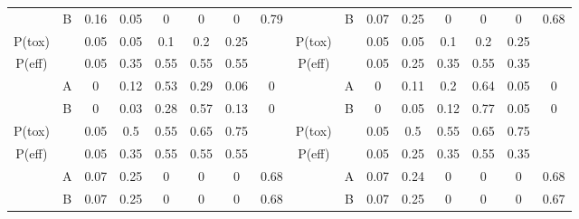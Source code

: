 \begin{table}
{\begin{tabular}[t]{ccccccc>{}c|cccccccc}
			\multirow{-2}{*}{\centering\arraybackslash 4} & B & 0.16 & 0.05 & 0 & 0 & 0 & 0.79 & \multirow{-2}{*}{\centering\arraybackslash 10} & B & 0.07 & 0.25 & 0 & 0 & 0 & 0.68\\
			\cmidrule{1-16}
			P(tox) &  & 0.05 & 0.05 & 0.1 & 0.2 & 0.25 &  & P(tox) &  & 0.05 & 0.05 & 0.1 & 0.2 & 0.25 & \\
			\cmidrule{1-16}
			P(eff) &  & 0.05 & 0.35 & 0.55 & 0.55 & 0.55 &  & P(eff) &  & 0.05 & 0.25 & 0.35 & 0.55 & 0.35 \vphantom{1} & \\
			\cmidrule{1-16}
			& A & 0 & 0.12 & 0.53 & 0.29 & 0.06 & 0 &  & A & 0 & 0.11 & 0.2 & 0.64 & 0.05 & 0\\
			
			\multirow{-2}{*}{\centering\arraybackslash 5} & B & 0 & 0.03 & 0.28 & 0.57 & 0.13 & 0 & \multirow{-2}{*}{\centering\arraybackslash 11} & B & 0 & 0.05 & 0.12 & 0.77 & 0.05 & 0\\
			\cmidrule{1-16}
			P(tox) &  & 0.05 & 0.5 & 0.55 & 0.65 & 0.75 &  & P(tox) &  & 0.05 & 0.5 & 0.55 & 0.65 & 0.75 & \\
			\cmidrule{1-16}
			P(eff) &  & 0.05 & 0.35 & 0.55 & 0.55 & 0.55 &  & P(eff) &  & 0.05 & 0.25 & 0.35 & 0.55 & 0.35 & \\
			\cmidrule{1-16}
			& A & 0.07 & 0.25 & 0 & 0 & 0 & 0.68 &  & A & 0.07 & 0.24 & 0 & 0 & 0 & 0.68\\
			
			\multirow{-2}{*}{\centering\arraybackslash 6} & B & 0.07 & 0.25 & 0 & 0 & 0 & 0.68 & \multirow{-2}{*}{\centering\arraybackslash 12} & B & 0.07 & 0.25 & 0 & 0 & 0 & 0.67\\
			\bottomrule
	\end{tabular}}
\end{table}


